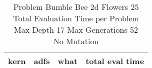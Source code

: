 \begin{table}[H]
\caption{Problem  Bumble Bee 2d  Flowers 25\\Total Evaluation Time per Problem \\ Max Depth 17 Max Generations 52\\ No Mutation \\}
\begin{center}
\scalebox{1.0} %
{
\begin{tabular}{lllr}
\hline
kern & adfs & what & total eval time \\
\hline


\end{tabular}
}
\end{center}
\end{table}

